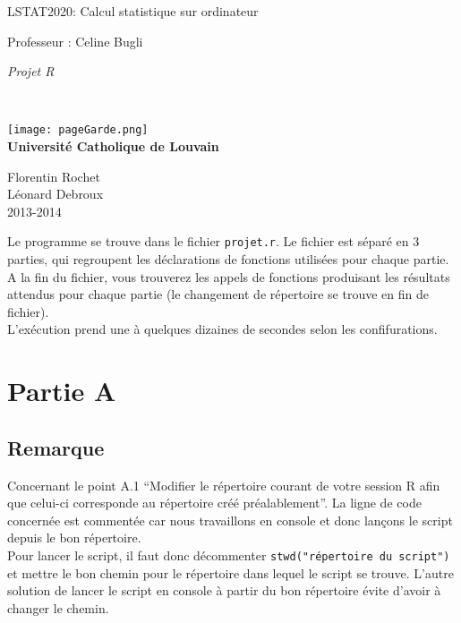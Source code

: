 \documentclass{article}
\begin{document}
\begin{titlepage}
    \begin{center}
        {\huge LSTAT2020: Calcul statistique sur ordinateur}\\
        \vspace{0.4cm}
        
        {\Large {Professeur : Celine Bugli}}\\
        \vspace{0.6cm}
        
        {\Large \textit{Projet R}}\\
        \vspace{1.2cm}

        \texttt{}\\
        \vspace{0.2cm}

        \texttt{[image: pageGarde.png]}\\
        \vspace{0.1cm}
        {\Large \textbf{Universit\'e Catholique de Louvain}}
        \vspace{0.7cm}

        \vspace{2cm}
        
        Florentin Rochet\\
        Léonard Debroux \\
        \vspace{0.2cm}
        2013-2014\\
    \end{center}
\end{titlepage}

Le programme se trouve dans le fichier \texttt{projet.r}. Le fichier est séparé en 3 parties, qui regroupent les déclarations de fonctions utilisées pour chaque partie. A la fin du fichier, vous trouverez les appels de fonctions produisant les résultats attendus pour chaque partie (le changement de répertoire se trouve en fin de fichier).\\
L'exécution prend une à quelques dizaines de secondes selon les confifurations.

\section{Partie A}

\subsection{Remarque}
Concernant le point A.1 ``Modifier le répertoire courant de votre session R afin que celui-ci corresponde au répertoire créé préalablement''. La ligne de code concernée est commentée car nous travaillons en console et donc lançons le script depuis le bon répertoire.\\
Pour lancer le script, il faut donc décommenter \texttt{stwd("répertoire du script")} et mettre le bon chemin pour le répertoire dans lequel le script se trouve. L'autre solution de lancer le script en console à partir du bon répertoire évite d'avoir à changer le chemin.
\end{document}
